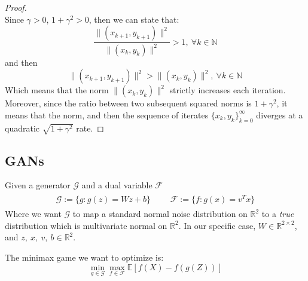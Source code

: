 \documentclass[12pt]{article}
\begin{document}
\begin{proof}
\begin{equation*}
\end{equation*}
Since $\gamma > 0$, $1 + \gamma^{2} > 0$, then we can state that:
\begin{equation*}
    \frac{\lVert (x_{k+1}, y_{k+1}) \rVert ^ 2}{\lVert (x_{k}, y_{k}) \rVert ^{2}} > 1, \ \forall k \in \mathbb{N}
\end{equation*}
and then
\begin{equation}
    \lVert (x_{k+1}, y_{k+1}) \rVert ^ 2 > \lVert (x_{k}, y_{k}) \rVert ^{2}, \ \forall k \in \mathbb{N}
\end{equation}
Which means that the norm $\lVert (x_{k}, y_{k}) \rVert ^{2}$ strictly increases each iteration. Moreover, since the ratio between two subsequent squared norms is $1 + \gamma^{2}$, it means that the norm, and then the sequence of iterates $\{x_k, y_k\}^{\infty}_{k=0}$ diverges at a quadratic $\sqrt{1 + \gamma^{2}}$ rate.

\end{proof}

\subsection{GANs}

Given a generator $\mathcal{G}$ and a dual variable $\mathcal{F}$
\begin{align}
\begin{aligned} \label{def:gan_funct}
    \mathcal{G}:= \{ g : g(z) = Wz + b \} \ \ \ \ \ \ \  & \mathcal{F} := \{ f : g(x) = v^{T}x \}
\end{aligned}
\end{align}
Where we want $\mathcal{G}$ to map a standard normal noise distribution on $\mathbb{R}^{2}$ to a \emph{true} distribution which is multivariate normal on $\mathbb{R}^{2}$. In our specific case, $W \in \mathbb{R}^{2 \times 2}$, and $z,\ x,\ v,\ b \in \mathbb{R}^{2}$.

The minimax game we want to optimize is:
\begin{equation}
    \min_{g \in \mathcal{G}} \max_{f \in \mathcal{F}} \mathbb{E}[f(X) - f(g(Z))]
\end{equation}
\end{document}
